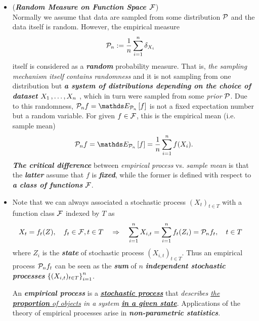 \documentclass[11pt]{article}
\begin{document}
\begin{itemize}
\item \begin{remark}(\textbf{\emph{Random Measure on Function Space ${\mathcal F}$}})\\
Normally we assume that data are sampled from some distribution ${\mathcal P}$ and the data itself is random. However, the empirical measure 
\begin{align*}
{\mathcal P}_n &:= \frac{1}{n}\sum_{i=1}^{n}\delta_{X_i}
\end{align*} itself is considered as a \emph{\textbf{random}} probability measure. That is, \emph{the sampling mechanism itself contains randomness} and it is not sampling from one distribution but \emph{\textbf{a system of distributions depending on the choice of dataset $X_1 \,{,}\ldots{,}\, X_n$ }}, which in turn were sampled from some \emph{prior} ${\mathcal P}$. Due to this randomness, $\cP_n f = \E{\cP_n}{f}$ is not a fixed expectation number but a random variable. For given $f\in {\mathcal F}$, this is the empirical mean (i.e. sample mean)
\begin{align*}
\cP_n f = \E{\cP_n}{f} = \frac{1}{n}\sum_{i=1}^n f(X_i).
\end{align*} \emph{\textbf{The critical difference}} between \emph{empirical process} vs. \emph{sample mean} is that the \emph{\textbf{latter}} assume that  $f$ is \emph{\textbf{fixed}}, while the former is defined with respect to \emph{\textbf{a class of functions}} ${\mathcal F}$.
\end{remark}

\item \begin{remark}
Note that we can always associated a stochastic process $(X_t)_{t\in T}$ with a function class ${\mathcal F}$ indexed by $T$ as
\begin{align*}
X_t = f_t(Z), \quad f_t \in {\mathcal F}, t \in T \quad &\Rightarrow  \quad \sum_{i=1}^n X_{i,t} = \sum_{i=1}^n f_t(Z_i) = {\mathcal P}_n f_t,  \quad t\in T
\end{align*} where $Z_i$ is the \emph{\textbf{state}} of  stochastic process $(X_{i,t})_{t\in T}$. Thus an empirical process ${\mathcal P}_n f_t$ can be seen as the \emph{\textbf{sum}} of $n$ \emph{\textbf{independent stochastic processes}} $\left\{(X_{i,t})_{t\in T}\right\}_{i =1}^{n}$. 

An \emph{\textbf{empirical process}} is a \underline{\emph{\textbf{stochastic process}}} that \emph{describes \underline{the \textbf{proportion} of objects} in a system \underline{\textbf{in a given state}}}.  Applications of the theory of empirical processes arise in \emph{\textbf{non-parametric statistics}}.
\end{remark}


\end{itemize}
\end{document}

